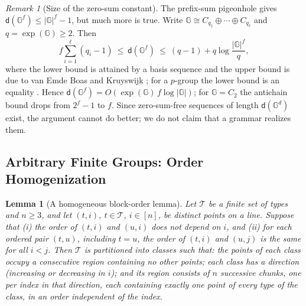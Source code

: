 \documentclass[11pt]{article}
\numberwithin{equation}{section}
\theoremstyle{plain}
\newtheorem{lemma}[theorem]{Lemma}
\theoremstyle{definition}
\theoremstyle{remark}
\newtheorem{remark}[theorem]{Remark}
\theoremstyle{plain}
\begin{document}
\begin{remark}[Size of the zero-sum constant]
\label{rem:davenport-size}
The prefix-sum pigeonhole gives $\mathsf d({\mathbb G}^f)\le|{\mathbb G}|^f-1$, but much more is true.
Write ${\mathbb G}\cong C_{q_1}\oplus\cdots\oplus C_{q_\ell}$ and $q=\exp({\mathbb G})\ge2$.  Then
\[
 f\sum_{i=1}^{\ell}(q_i-1)\ \le\ \mathsf d({\mathbb G}^f)\ \le\ (q-1)+q\log\frac{|{\mathbb G}|^f}{q},
\]
where the lower bound is attained by a basis sequence and the upper bound is due to
van Emde Boas and Kruyswijk \cite[Proposition~5.1.8 and
Theorem~5.5.5]{GeroldingerHalterKoch2006}; for a $p$-group the lower bound is an
equality \cite[Theorem~5.5.9]{GeroldingerHalterKoch2006}.  Hence
$\mathsf d({\mathbb G}^f)=O(\exp({\mathbb G})\,f\log|{\mathbb G}|)$; for ${\mathbb G}=C_2$ the antichain bound drops from
$2^f-1$ to $f$.  Since zero-sum-free sequences of length $\mathsf d({\mathbb G}^d)$ exist, the
argument cannot do better; we do not claim that a grammar realizes them.
\end{remark}

\subsection{Arbitrary Finite Groups: Order Homogenization}
\label{app:window-group}

\begin{lemma}[A homogeneous block-order lemma]
\label{lem:group-block-order}
Let $\mathcal T$ be a finite set of types and $n\ge3$, and let $(t,i)$, $t\in\mathcal T$, $i\in[n]$, be distinct
points on a line.  Suppose that \textup{(i)} the order of $(t,i)$ and $(u,i)$ does
not depend on $i$, and \textup{(ii)} for each ordered pair $(t,u)$, including
$t=u$, the order of $(t,i)$ and $(u,j)$ is the same for all $i<j$.  Then $\mathcal T$ is
partitioned into classes such that: the points of each class occupy a
consecutive region containing no other points; each class has a direction
(increasing or decreasing in $i$); and its region consists of $n$ successive
\emph{chunks}, one per index in that direction, each containing exactly one point
of every type of the class, in an order independent of the index.
\end{lemma}
\end{document}
